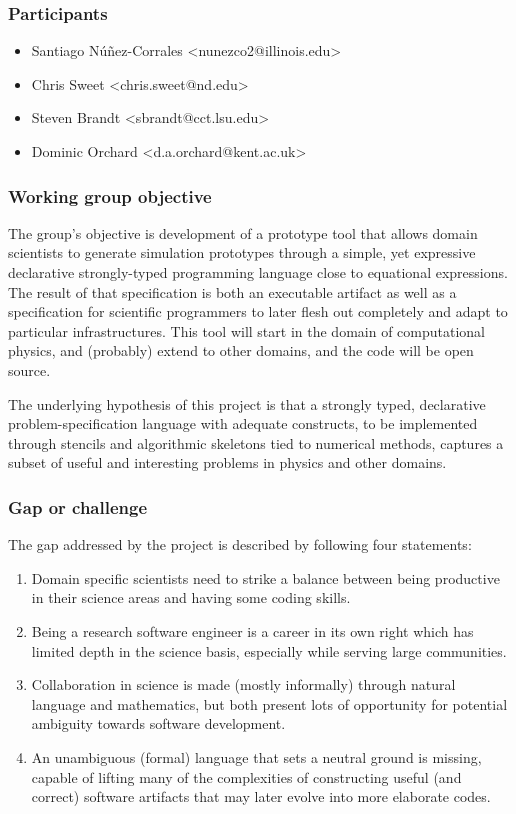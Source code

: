 \subsubsection{Participants}

\begin{itemize}
  \item Santiago N\'u\~nez-Corrales <nunezco2@illinois.edu>
  \item Chris Sweet <chris.sweet@nd.edu>
  \item Steven Brandt <sbrandt@cct.lsu.edu>
  \item Dominic Orchard <d.a.orchard@kent.ac.uk>
\end{itemize}

\subsubsection{Working group objective}

The group's objective is development of a prototype tool that allows domain scientists to generate
simulation prototypes through a simple, yet expressive declarative
strongly-typed programming language close to equational expressions. The result
of that specification is both an executable artifact as well as a specification
for scientific programmers to later flesh out completely and adapt to particular
infrastructures. This tool will start in the domain of computational physics,
and (probably) extend to other domains, and the code will be open source.

The underlying hypothesis of this project is that a strongly typed, declarative
problem-specification language with adequate constructs, to be implemented
through stencils and algorithmic skeletons tied to numerical methods, captures a
 subset of useful and interesting problems in physics and other domains.

\subsubsection{Gap or challenge}

The gap addressed by the project is described by
following four statements:

\begin{enumerate}
  \item Domain specific scientists need to strike a balance between being
  productive in their science areas and having some coding skills.
  \item Being a research software engineer is a career in its own right which
  has limited depth in the science basis, especially while serving large
  communities.
  \item Collaboration in science is made (mostly informally) through natural
  language and mathematics, but both present lots of opportunity for potential
  ambiguity towards software development.
  \item An unambiguous (formal) language that sets a neutral ground is missing,
  capable of lifting many of the complexities of constructing useful (and
  correct) software artifacts that may later evolve into more elaborate codes.
\end{enumerate}

